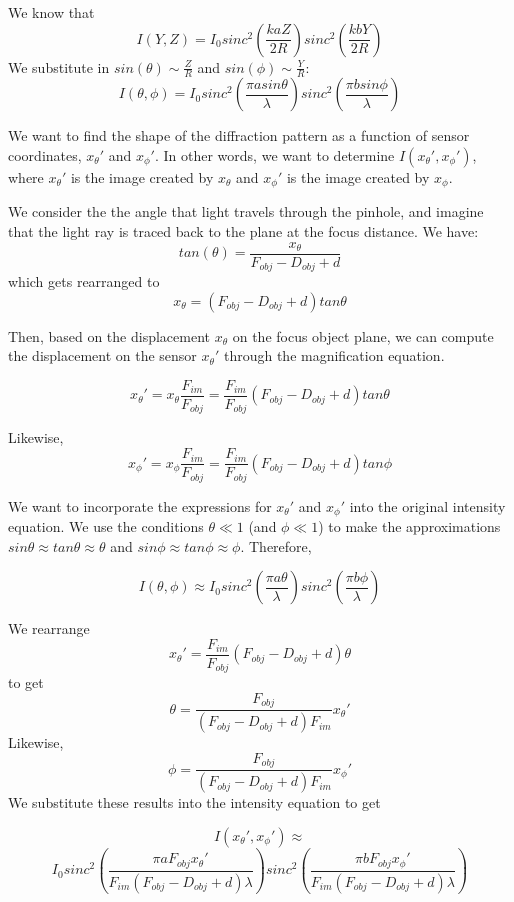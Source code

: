 \documentclass{acmsiggraph}
\begin{document}
We know that $$I(Y,Z) = I_0  sinc^2\left(\frac{kaZ}{2R}\right) sinc^2\left(\frac{kbY}{2R}\right)$$
We substitute in $sin(\theta) \sim \frac{Z}{R}$ and $sin(\phi) \sim \frac{Y}{R}$:
$$I(\theta,\phi) = I_0  sinc^2\left(\frac{\pi a sin \theta}{\lambda}\right) sinc^2 \left(\frac{\pi b sin \phi}{\lambda}\right)$$

We want to find the shape of the diffraction pattern as a function of sensor coordinates, $x_{\theta}'$ and $x_{\phi}'$. In other words, we want to determine $I(x_{\theta}', x_{\phi}')$, where $x_{\theta}'$ is the image created by $x_{\theta}$ and $x_{\phi}'$ is the image created by $x_{\phi}$. 

We consider the the angle that light travels through the pinhole, and imagine that the light ray is traced back to the plane at the focus distance. We have: 
$$tan(\theta) = \frac{x_{\theta}}{F_{obj} - D_{obj} + d}$$ 
which gets rearranged to 
$$x_{\theta} = (F_{obj} - D_{obj} + d) tan\theta$$

Then, based on the displacement $x_{\theta}$ on the focus object plane, we can compute the displacement on the sensor $x_{\theta}'$ through the magnification equation. 

$$x_{\theta}' = x_{\theta} \frac{F_{im}}{F_{obj}} =  \frac{F_{im}}{F_{obj}} (F_{obj} - D_{obj} + d) tan\theta $$

Likewise, $$x_{\phi}' = x_{\phi} \frac{F_{im}}{F_{obj}} =  \frac{F_{im}}{F_{obj}} (F_{obj} - D_{obj} + d) tan\phi $$

We want to incorporate the expressions for $x_{\theta}'$ and $x_{\phi}'$ into the original intensity equation. We use the conditions $\theta \ll 1$ (and $\phi \ll 1$) to make the approximations $sin\theta \approx tan\theta \approx \theta$ and $sin\phi \approx tan\phi \approx \phi$. Therefore, 

$$I(\theta, \phi) \approx I_0 sinc^2(\frac{\pi a \theta}{\lambda}) sinc^2(\frac{\pi b \phi}{\lambda})$$

We rearrange $$x_{\theta}' = \frac{F_{im}}{F_{obj}} (F_{obj} - D_{obj} + d) \theta $$ to get $$\theta =  \frac{F_{obj}} {(F_{obj} - D_{obj} + d)F_{im}} x_{\theta}'$$ Likewise,  $$\phi =  \frac{F_{obj}} {(F_{obj} - D_{obj} + d)F_{im}} x_{\phi}'$$ We substitute these results into the intensity equation to get

$$I(x_{\theta}', x_{\phi}') \approx $$ $$I_0 sinc^2 (\frac{\pi a F_{obj} x_{\theta}'}{F_{im}(F_{obj} - D_{obj} + d)\lambda}) sinc^2 (\frac{\pi b F_{obj} x_{\phi}'}{F_{im}(F_{obj} - D_{obj} + d)\lambda})$$
\end{document}
